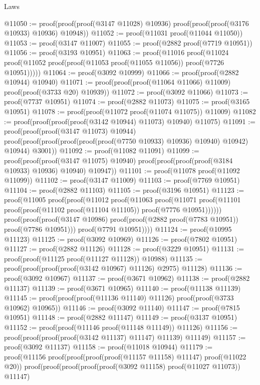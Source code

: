 \begin{lexlean}{Laws}
\begin{coremodule}
@11050 := proof(proof(proof(@3147 @11028) @10936) proof(proof(proof(@3176 @10933) @10936) @10948))
@11052 := proof(@11031 proof(@11044 @11050))
@11053 := proof(@3147 @11007)
@11055 := proof(@2882 proof(@7719 @10951))
@11056 := proof(@3193 @10951)
@11063 := proof(@11016
      proof(@11024 proof(@11052 proof(proof(@11053 proof(@11055 @11056)) proof(@7726 @10951)))))
@11064 := proof(@3092 @10999)
@11066 := proof(proof(@2882 @10944) @10940)
@11071 := proof(proof(proof(@11064 @11066) @11009) proof(proof(@3733 @20) @10939))
@11072 := proof(@3092 @11066)
@11073 := proof(@7737 @10951)
@11074 := proof(@2882 @11073)
@11075 := proof(@3165 @10951)
@11078 := proof(proof(@11072 proof(@11074 @11075)) @11009)
@11082 := proof(proof(proof(proof(@3142 @10944) @11073) @10940) @11075)
@11091 := proof(proof(proof(@3147 @11073) @10944)
      proof(proof(proof(proof(proof(proof(@7750 @10933) @10936) @10940) @10942) @10944) @3001))
@11092 := proof(@11082 @11091)
@11099 := proof(proof(proof(@3147 @11075) @10940)
      proof(proof(proof(proof(@3184 @10933) @10936) @10940) @10947))
@11101 := proof(@11078 proof(@11092 @11099))
@11102 := proof(@3147 @11009)
@11103 := proof(@7769 @10951)
@11104 := proof(@2882 @11103)
@11105 := proof(@3196 @10951)
@11123 := proof(@11005
      proof(proof(@11012
            proof(@11063
                proof(@11071
                    proof(@11101 proof(proof(@11102 proof(@11104 @11105)) proof(@7776 @10951))))))
          proof(proof(proof(@3147 @10986)
                proof(proof(@2882 proof(@7783 @10951)) proof(@7786 @10951)))
              proof(@7791 @10951))))
@11124 := proof(@10995 @11123)
@11125 := proof(@3092 @10969)
@11126 := proof(@7802 @10951)
@11127 := proof(@2882 @11126)
@11128 := proof(@3229 @10951)
@11131 := proof(proof(@11125 proof(@11127 @11128)) @10988)
@11135 := proof(proof(proof(proof(@3142 @10967) @11126) @2975) @11128)
@11136 := proof(@3092 @10967)
@11137 := proof(@3671 @10962)
@11138 := proof(@2882 @11137)
@11139 := proof(@3671 @10965)
@11140 := proof(@11138 @11139)
@11145 := proof(proof(proof(@11136 @11140) @11126) proof(proof(@3733 @10962) @10965))
@11146 := proof(@3092 @11140)
@11147 := proof(@7815 @10951)
@11148 := proof(@2882 @11147)
@11149 := proof(@3137 @10951)
@11152 := proof(proof(@11146 proof(@11148 @11149)) @11126)
@11156 := proof(proof(proof(proof(@3142 @11137) @11147) @11139) @11149)
@11157 := proof(@3092 @11137)
@11158 := proof(@11018 @10944)
@11179 := proof(@11156
      proof(proof(proof(proof(@11157 @11158) @11147) proof(@11022 @20))
          proof(proof(proof(proof(proof(@3092 @11158) proof(@11027 @11073)) @11147)

\end{coremodule}
\end{lexlean}
